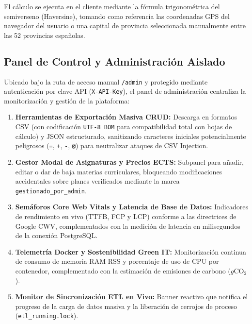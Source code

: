 El cálculo se ejecuta en el cliente mediante la fórmula trigonométrica del semiverseno (Haversine), tomando como referencia las coordenadas GPS del navegador del usuario o una capital de provincia seleccionada manualmente entre las 52 provincias españolas.

\subsection{Panel de Control y Administración Aislado}
Ubicado bajo la ruta de acceso manual \texttt{/admin} y protegido mediante autenticación por clave API (\texttt{X-API-Key}), el panel de administración centraliza la monitorización y gestión de la plataforma:
\begin{enumerate}
    \item \textbf{Herramientas de Exportación Masiva CRUD:} Descarga en formatos CSV (con codificación \texttt{UTF-8 BOM} para compatibilidad total con hojas de cálculo) y JSON estructurado, sanitizando caracteres iniciales potencialmente peligrosos (\texttt{=}, \texttt{+}, \texttt{-}, \texttt{@}) para neutralizar ataques de CSV Injection.
    \item \textbf{Gestor Modal de Asignaturas y Precios ECTS:} Subpanel para añadir, editar o dar de baja materias curriculares, bloqueando modificaciones accidentales sobre planes verificados mediante la marca \texttt{gestionado\_por\_admin}.
    \item \textbf{Semáforos Core Web Vitals y Latencia de Base de Datos:} Indicadores de rendimiento en vivo (TTFB, FCP y LCP) conforme a las directrices de Google CWV, complementados con la medición de latencia en milisegundos de la conexión PostgreSQL.
    \item \textbf{Telemetría Docker y Sostenibilidad Green IT:} Monitorización continua de consumo de memoria RAM RSS y porcentaje de uso de CPU por contenedor, complementado con la estimación de emisiones de carbono ($g\text{CO}_2$).
    \item \textbf{Monitor de Sincronización ETL en Vivo:} Banner reactivo que notifica el progreso de la carga de datos masiva y la liberación de cerrojos de proceso (\texttt{etl\_running.lock}).
\end{enumerate}
